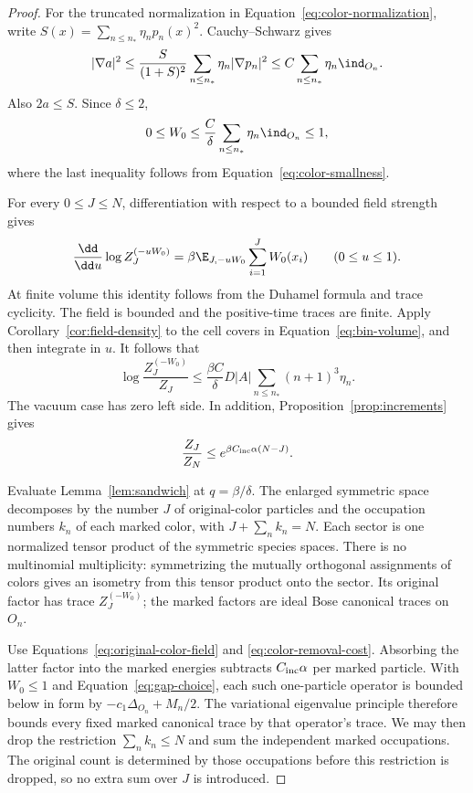 \begin{proof}
For the truncated normalization in
Equation~\eqref{eq:color-normalization}, write
$S(x)=\sum_{n\le n_*}\eta_np_n(x)^2$.
Cauchy--Schwarz gives
\[
 |\nabla a|^2
 \le\frac{S}{(1+S)^2}
               \sum_{n\le n_*}\eta_n|\nabla p_n|^2
 \le C\sum_{n\le n_*}\eta_n\ind_{O_n}.
\]
Also $2a\le S$.  Since $\delta\le2$,
\begin{equation}\label{eq:color-field-bound}
 0\le W_0\le\frac C\delta
                  \sum_{n\le n_*}\eta_n\ind_{O_n}\le1,
\end{equation}
where the last inequality follows from
Equation~\eqref{eq:color-smallness}.

For every $0\le J\le N$, differentiation with respect
to a bounded field strength gives
\[
 \frac{\dd}{\dd u}\log Z_J^{(-uW_0)}
 =\beta\E_{J,-uW_0}\sum_{i=1}^J W_0(x_i)
 \qquad(0\le u\le1).
\]
At finite volume this identity follows from the
Duhamel formula and trace cyclicity.  The field is
bounded and the positive-time traces are finite.
Apply Corollary~\ref{cor:field-density} to the cell
covers in Equation~\eqref{eq:bin-volume}, and then
integrate in $u$.  It follows that
\begin{equation}\label{eq:original-color-field}
 \log\frac{Z_J^{(-W_0)}}{Z_J}
 \le\frac{\beta C}{\delta}D|A|
                     \sum_{n\le n_*}(n+1)^3\eta_n.
\end{equation}
The vacuum case has zero left side.  In addition,
Proposition~\ref{prop:increments} gives
\begin{equation}\label{eq:color-removal-cost}
 \frac{Z_J}{Z_N}\le e^{\beta C_{\rm inc}\alpha(N-J)}.
\end{equation}

Evaluate Lemma~\ref{lem:sandwich} at $q=\beta/\delta$.
The enlarged symmetric space decomposes by the number
$J$ of original-color particles and the occupation
numbers $k_n$ of each marked color, with
$J+\sum_n k_n=N$.  Each sector is one normalized
tensor product of the symmetric species spaces.
There is no multinomial multiplicity: symmetrizing
the mutually orthogonal assignments of colors gives
an isometry from this tensor product onto the sector.
Its original factor has trace $Z_J^{(-W_0)}$;
the marked factors are ideal Bose canonical traces
on $O_n$.

Use Equations~\eqref{eq:original-color-field} and
\eqref{eq:color-removal-cost}.  Absorbing the latter
factor into the marked energies subtracts
$C_{\rm inc}\alpha$ per marked particle.  With
$W_0\le1$ and Equation~\eqref{eq:gap-choice}, each
such one-particle operator is bounded below in form
by $-c_1\Delta_{O_n}+M_n/2$.  The variational
eigenvalue principle therefore bounds every fixed
marked canonical trace by that operator's trace.
We may then drop the restriction $\sum_nk_n\le N$
and sum the independent marked occupations.  The
original count is determined by those occupations
before this restriction is dropped, so no extra
sum over $J$ is introduced.


\end{proof}
